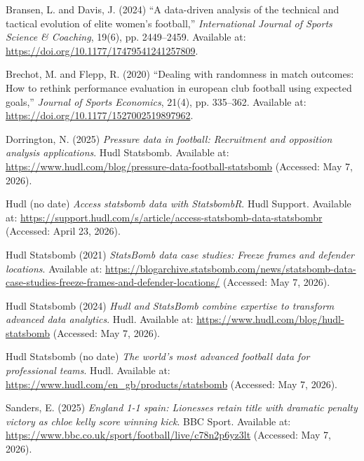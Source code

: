 \documentclass[
  11pt,
  a4paper,
  DIV=11,
  numbers=noendperiod]{scrartcl}
\newlength{\cslhangindent}
\newenvironment{CSLReferences}[2] %
 {\begin{list}{}{%
  \setlength{\itemindent}{0pt}
  \setlength{\leftmargin}{0pt}
  \setlength{\parsep}{0pt}
  \ifodd #1
   \setlength{\leftmargin}{\cslhangindent}
   \setlength{\itemindent}{-1\cslhangindent}
  \fi
  \setlength{\itemsep}{#2\baselineskip}}}
 {\end{list}}
\begin{document}
\label{refs}
\begin{CSLReferences}{0}{1}
Bransen, L. and Davis, J. (2024) {``A data-driven analysis of the
technical and tactical evolution of elite women's football,''}
\emph{International Journal of Sports Science \& Coaching}, 19(6), pp.
2449--2459. Available at:
\url{https://doi.org/10.1177/17479541241257809}.

Brechot, M. and Flepp, R. (2020) {``Dealing with randomness in match
outcomes: How to rethink performance evaluation in european club
football using expected goals,''} \emph{Journal of Sports Economics},
21(4), pp. 335--362. Available at:
\url{https://doi.org/10.1177/1527002519897962}.

Dorrington, N. (2025) \emph{Pressure data in football: Recruitment and
opposition analysis applications}. Hudl Statsbomb. Available at:
\url{https://www.hudl.com/blog/pressure-data-football-statsbomb}
(Accessed: May 7, 2026).

Hudl (no date) \emph{Access statsbomb data with StatsbombR}. Hudl
Support. Available at:
\url{https://support.hudl.com/s/article/access-statsbomb-data-statsbombr}
(Accessed: April 23, 2026).

Hudl Statsbomb (2021) \emph{StatsBomb data case studies: Freeze frames
and defender locations}. Available at:
\url{https://blogarchive.statsbomb.com/news/statsbomb-data-case-studies-freeze-frames-and-defender-locations/}
(Accessed: May 7, 2026).

Hudl Statsbomb (2024) \emph{Hudl and StatsBomb combine expertise to
transform advanced data analytics}. Hudl. Available at:
\url{https://www.hudl.com/blog/hudl-statsbomb} (Accessed: May 7, 2026).

Hudl Statsbomb (no date) \emph{The world's most advanced football data
for professional teams}. Hudl. Available at:
\url{https://www.hudl.com/en_gb/products/statsbomb} (Accessed: May 7,
2026).

Sanders, E. (2025) \emph{England 1-1 spain: Lionesses retain title with
dramatic penalty victory as chloe kelly score winning kick}. BBC Sport.
Available at:
\url{https://www.bbc.co.uk/sport/football/live/c78n2p6yz3lt} (Accessed:
May 7, 2026).


\end{CSLReferences}
\end{document}

